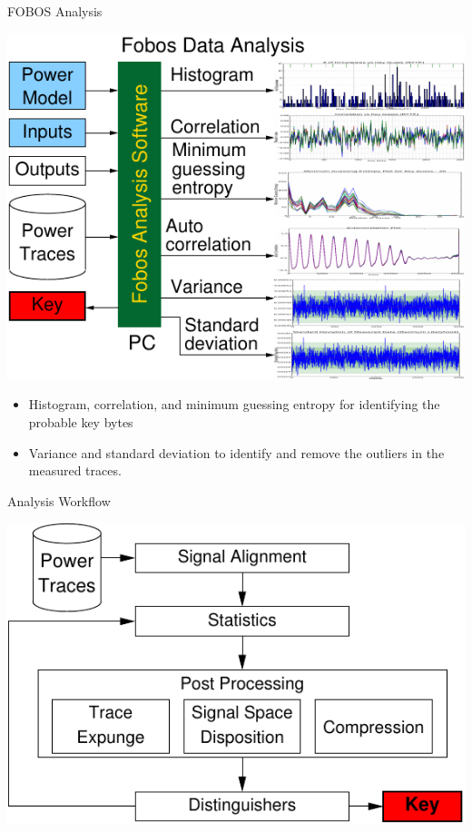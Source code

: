\documentclass[xcolor=pdftex,dvipsnames,table,final]{beamer}
\begin{document}
\begin{frame}[fragile]{}
\begin{columns}[t]
\begin{column}{.31\linewidth}
       \begin{block}{FOBOS Analysis}
        \begin{minipage}{0.69\linewidth}
		\includegraphics[scale=1.5]{../figures/fobos-dan}
        \end{minipage}
	\hspace{-5ex}
	\begin{minipage}{0.31\linewidth}
		{\small
		\begin{itemize}
		 \item Histogram, correlation, and minimum guessing entropy for 
		       identifying the probable key bytes
		 \item Variance and standard deviation to identify and remove the outliers 
		       in the measured traces. 
		\end{itemize}
	}  
	\end{minipage} 
       \end{block}
       \begin{block}{Analysis Workflow}
        \begin{center}
          \includegraphics[scale=1.5]{../figures/data_anl}

\end{center}
\end{block}
\end{column}
\end{columns}
\end{frame}
\end{document}
